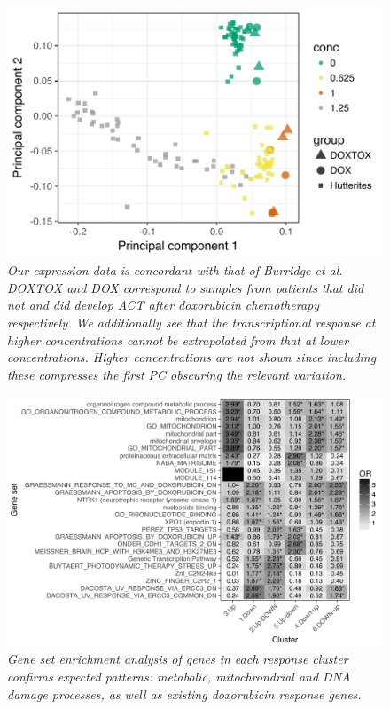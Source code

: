 \documentclass{article}
\begin{document}
{\begin{figure}
\begin{center}
    \includegraphics[width=.6\textwidth]{../figures/burridge_comparison.pdf} %
    \caption{\it{Our expression data is concordant with that of Burridge et al\citep{burridge}. DOXTOX and DOX correspond to samples from patients that did not and did develop ACT after doxorubicin chemotherapy respectively. We additionally see that the transcriptional response at higher concentrations cannot be extrapolated from that at lower concentrations. Higher concentrations are not shown since including these compresses the first PC obscuring the relevant variation.}}
    \label{fig:burridge}
    \end{center}
\end{figure}

\begin{figure}
\begin{center}
    \includegraphics[width=1\textwidth]{../figures/cluster_go.pdf} %
    \caption{\it{Gene set enrichment analysis of genes in each response cluster confirms expected patterns: metabolic, mitochrondrial and DNA damage processes, as well as existing doxorubicin response genes.}}
    \label{fig:go}
    \end{center}
\end{figure}

}
\end{document}
